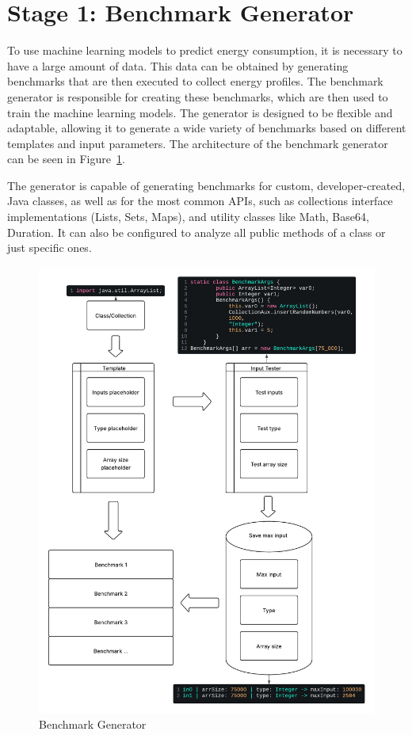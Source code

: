\section{Stage 1: Benchmark Generator} \label{sec:work_stage1_program_generator}




To use machine learning models to predict energy consumption, it is necessary to have a large amount of data. This data can be obtained by generating benchmarks that are then executed to collect energy profiles. The benchmark generator is responsible for creating these benchmarks, which are then used to train the machine learning models. The generator is designed to be flexible and adaptable, allowing it to generate a wide variety of benchmarks based on different templates and input parameters. The architecture of the benchmark generator can be seen in Figure~\ref{fig:program_generator}.


The generator is capable of generating benchmarks for custom, developer-created, Java classes, as well as for the most common APIs, such as collections interface implementations (Lists, Sets, Maps), and utility classes like Math, Base64, Duration. It can also be configured to analyze all public methods of a class or just specific ones.

\begin{figure}[htbp]%
    \centering
    \includegraphics[width = 1 \textwidth]{figures/program_generator.pdf}
    \caption{Benchmark Generator}
    \label{fig:program_generator}
\end{figure}


